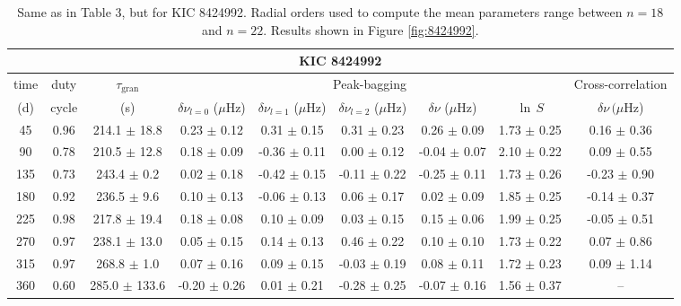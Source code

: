 \documentclass[twocolumn]{aastex61}%
\begin{document}
\begin{table*}[ht]\centering\fontsize{9.}{7.}\selectfont
\begin{tabular}{ccc|ccccc|c}
\multicolumn{9}{c}{KIC 8424992}\\ \hline\hline
time & duty & $\tau_\text{gran}$ &\multicolumn{5}{c|}{Peak-bagging}&Cross-correlation\\
(d)& cycle & (s)&$\delta\nu_{l=0}$ ($\mu$Hz) & $\delta\nu_{l=1}$ ($\mu$Hz) & $\delta\nu_{l=2}$ ($\mu$Hz) & $\delta\nu$ ($\mu$Hz)& $\ln\,S$ & $\delta\nu\,(\mu$Hz)\\\hline
45 & 0.96 & 214.1 $\pm$ 18.8 & 0.23 $\pm$ 0.12 & 0.31 $\pm$ 0.15 & 0.31 $\pm$ 0.23 & 0.26 $\pm$ 0.09 & 1.73 $\pm$ 0.25 & 0.16 $\pm$ 0.36\\
90 & 0.78 & 210.5 $\pm$ 12.8 & 0.18 $\pm$ 0.09 & -0.36 $\pm$ 0.11 & 0.00 $\pm$ 0.12 & -0.04 $\pm$ 0.07 & 2.10 $\pm$ 0.22 & 0.09 $\pm$ 0.55\\
135 & 0.73 & 243.4 $\pm$ 0.2 & 0.02 $\pm$ 0.18 & -0.42 $\pm$ 0.15 & -0.11 $\pm$ 0.22 & -0.25 $\pm$ 0.11 & 1.73 $\pm$ 0.26 & -0.23 $\pm$ 0.90\\
180 & 0.92 & 236.5 $\pm$ 9.6 & 0.10 $\pm$ 0.13 & -0.06 $\pm$ 0.13 & 0.06 $\pm$ 0.17 & 0.02 $\pm$ 0.09 & 1.85 $\pm$ 0.25 & -0.14 $\pm$ 0.37\\
225 & 0.98 & 217.8 $\pm$ 19.4 & 0.18 $\pm$ 0.08 & 0.10 $\pm$ 0.09 & 0.03 $\pm$ 0.15 & 0.15 $\pm$ 0.06 & 1.99 $\pm$ 0.25 & -0.05 $\pm$ 0.51\\
270 & 0.97 & 238.1 $\pm$ 13.0 & 0.05 $\pm$ 0.15 & 0.14 $\pm$ 0.13 & 0.46 $\pm$ 0.22 & 0.10 $\pm$ 0.10 & 1.73 $\pm$ 0.22 & 0.07 $\pm$ 0.86\\
315 & 0.97 & 268.8 $\pm$ 1.0 & 0.07 $\pm$ 0.16 & 0.09 $\pm$ 0.15 & -0.03 $\pm$ 0.19 & 0.08 $\pm$ 0.11 & 1.72 $\pm$ 0.23 & 0.09 $\pm$ 1.14\\
360 & 0.60 & 285.0 $\pm$ 133.6 & -0.20 $\pm$ 0.26 & 0.01 $\pm$ 0.21 & -0.28 $\pm$ 0.25 & -0.07 $\pm$ 0.16 & 1.56 $\pm$ 0.37 & --\\
\end{tabular}
\caption{Same as in Table 3, but for KIC 8424992. Radial orders used to compute the mean parameters range between $n=18$ and $n=22$. Results shown in Figure \ref{fig:8424992}.}\label{tab:8424992}
\end{table*}
\end{document}
